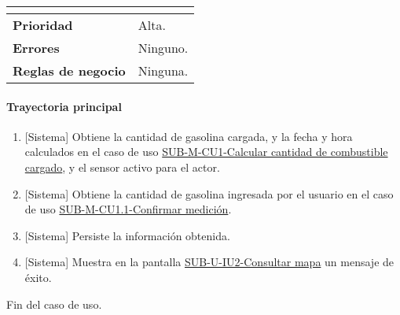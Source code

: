 \begin{longtable}{|J{5cm}|J{10.3cm}|}
\begin{itemize}
		\end{itemize} 
		\\ \hline 
	\textbf{Prioridad} & 
		Alta. \\ \hline
	\textbf{Errores} & Ninguno.
		\\ \hline
	\textbf{Reglas de negocio} & Ninguna.
		 \\ \hline
\end{longtable}

\paragraph{Trayectoria principal}
	\begin{enumerate}
		\item {[Sistema]} Obtiene la cantidad de gasolina cargada, y la fecha y hora calculados en el caso de uso \hyperref[SUB-M-CU1]{SUB-M-CU1-Calcular cantidad de combustible cargado}, y el sensor activo para el actor.
		\item {[Sistema]} Obtiene la cantidad de gasolina ingresada por el usuario en el caso de uso \hyperref[SUB-M-CU1.1]{SUB-M-CU1.1-Confirmar medición}.
		\item {[Sistema]} Persiste la información obtenida.
		\item {[Sistema]} Muestra en la pantalla \hyperref[fig:sub-c-iu2]{SUB-U-IU2-Consultar mapa} un mensaje de éxito.
	\end{enumerate}
	Fin del caso de uso.
